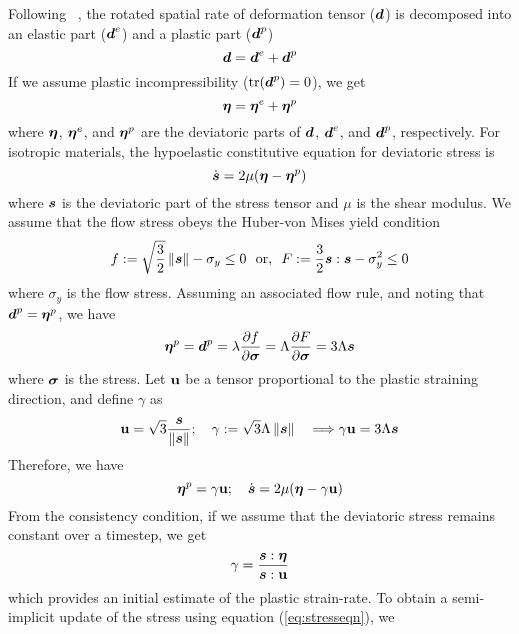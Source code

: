   Following ~\cite{Maudlin96}, the rotated spatial rate of deformation 
  tensor ($\Bd$) is decomposed into an elastic part ($\Bd^e$) and a 
  plastic part ($\Bd^p$)
  \begin{equation}
     \Bd = \Bd^e + \Bd^p
  \end{equation}
  If we assume plastic incompressibility ($\Tr{(\Bd^p)} = 0$), we get
  \begin{equation}
     \Beta = \Beta^e + \Beta^p
  \end{equation}
  where $\Beta$, $\Beta^e$, and $\Beta^p$ are the deviatoric parts of $\Bd$,
  $\Bd^e$, and $\Bd^p$, respectively.  For isotropic materials, the hypoelastic
  constitutive equation for deviatoric stress is
  \begin{equation}
    \dot{\Bs} = 2\mu(\Beta - \Beta^p)
  \end{equation}
  where $\Bs$ is the deviatoric part of the stress tensor and $\mu$ is the
  shear modulus.  We assume that the flow stress obeys the Huber-von Mises
  yield condition
  \begin{equation}
    f := \sqrt{\frac{3}{2}}\norm{\Bs} - \sigma_y \le 0  ~~\text{or,}~~
    F := \frac{3}{2} \Bs:\Bs - \sigma_y^2 \le 0 
  \end{equation}
  where $\sigma_y$ is the flow stress.  Assuming an associated flow rule,
  and noting that $\Bd^p = \Beta^p$, we have
  \begin{equation}
    \Beta^p = \Bd^p = \lambda\Partial{f}{\Bsig} 
                    = \Lambda\Partial{F}{\Bsig} = 3\Lambda\Bs
  \end{equation}
  where $\Bsig$ is the stress.  Let $\Bu$ be a tensor proportional to the 
  plastic straining direction, and define $\gamma$ as
  \begin{equation}
    \Bu = \sqrt{3} \frac{\Bs}{\norm{\Bs}}; \quad
    \gamma := \sqrt{3}\Lambda\norm{\Bs}  \quad \Longrightarrow
    \gamma\Bu = 3\Lambda\Bs
  \end{equation}
  Therefore, we have
  \begin{equation} \label{eq:stresseqn}
    \Beta^p = \gamma\Bu; \quad  
    \dot{\Bs} = 2\mu(\Beta - \gamma\Bu)
  \end{equation}
  From the consistency condition, if we assume that the deviatoric stress
  remains constant over a timestep, we get 
  \begin{equation}
    \gamma = \frac{\Bs:\Beta}{\Bs:\Bu}
  \end{equation}
  which provides an initial estimate of the plastic strain-rate.  To obtain
  a semi-implicit update of the stress using equation (\ref{eq:stresseqn}), we
